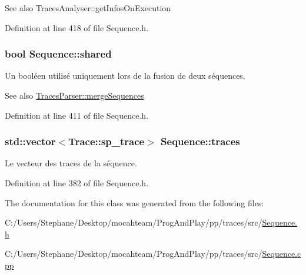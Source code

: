 \begin{DoxySeeAlso}{See also}
Traces\+Analyser\+::get\+Infos\+On\+Execution 
\end{DoxySeeAlso}


Definition at line 418 of file Sequence.\+h.

\subsubsection[{\texorpdfstring{shared}{shared}}]{\setlength{\rightskip}{0pt plus 5cm}bool Sequence\+::shared\hspace{0.3cm}{\ttfamily [protected]}}\hypertarget{class_sequence_a77c5ea96e0222cb80d5a8cf420e1d624}{}\label{class_sequence_a77c5ea96e0222cb80d5a8cf420e1d624}
Un booléen utilisé uniquement lors de la fusion de deux séquences.

\begin{DoxySeeAlso}{See also}
\hyperlink{class_traces_parser_ac304d9f86b7a99e29ec9d6aacd748d41}{Traces\+Parser\+::merge\+Sequences} 
\end{DoxySeeAlso}


Definition at line 411 of file Sequence.\+h.

\subsubsection[{\texorpdfstring{traces}{traces}}]{\setlength{\rightskip}{0pt plus 5cm}std\+::vector$<${\bf Trace\+::sp\+\_\+trace}$>$ Sequence\+::traces\hspace{0.3cm}{\ttfamily [protected]}}\hypertarget{class_sequence_a2e22b6d3eda29911dda95aa36efefa83}{}\label{class_sequence_a2e22b6d3eda29911dda95aa36efefa83}
Le vecteur des traces de la séquence. 

Definition at line 382 of file Sequence.\+h.



The documentation for this class was generated from the following files\+:\begin{DoxyCompactItemize}
\item 
C\+:/\+Users/\+Stephane/\+Desktop/mocahteam/\+Prog\+And\+Play/pp/traces/src/\hyperlink{_sequence_8h}{Sequence.\+h}\item 
C\+:/\+Users/\+Stephane/\+Desktop/mocahteam/\+Prog\+And\+Play/pp/traces/src/\hyperlink{_sequence_8cpp}{Sequence.\+cpp}\end{DoxyCompactItemize}
